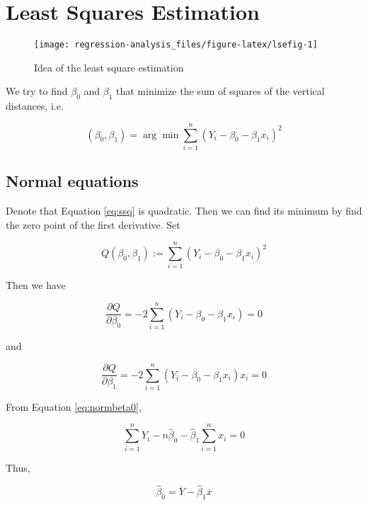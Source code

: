 \documentclass[]{book}
\theoremstyle{definition}
\theoremstyle{definition}
\theoremstyle{definition}
\theoremstyle{remark}
\begin{document}
\section{Least Squares Estimation}\label{least-squares-estimation}

\begin{figure}[H]

{\centering \texttt{[image: regression-analysis\_files/figure-latex/lsefig-1]} 

}

\caption{Idea of the least square estimation}\label{fig:lsefig}
\end{figure}

We try to find \(\beta_0\) and \(\beta_1\) that minimize the sum of
squares of the vertical distances, i.e.

\begin{equation}
  (\beta_0, \beta_1) = \arg\min \sum_{i = 1}^n (Y_i - \beta_0 - \beta_1 x_i)^2
  \label{eq:ssq}
\end{equation}

\subsection{Normal equations}\label{normal-equations}

Denote that Equation \eqref{eq:ssq} is quadratic. Then we can find its
minimum by find the zero point of the first derivative. Set

\[Q(\beta_0, \beta_1) := \sum_{i = 1}^n (Y_i - \beta_0 - \beta_1 x_i)^2\]

Then we have

\begin{equation}
  \frac{\partial Q}{\partial \beta_0} = -2 \sum_{i = 1}^n(Y_i - \beta_0 - \beta_1 x_i) = 0
  \label{eq:normbeta0}
\end{equation}

and

\begin{equation}
  \frac{\partial Q}{\partial \beta_1} = -2 \sum_{i = 1}^n (Y_i - \beta_0 - \beta_1 x_i)x_i = 0
  \label{eq:normbeta1}
\end{equation}

From Equation \eqref{eq:normbeta0},

\[\sum_{i = 1}^n Y_i - n \hat\beta_0 - \hat\beta_1 \sum_{i = 1}^n x_i = 0\]

Thus,

\[\hat\beta_0 = \overline{Y} - \hat\beta_1 \overline{x}\]
\end{document}
